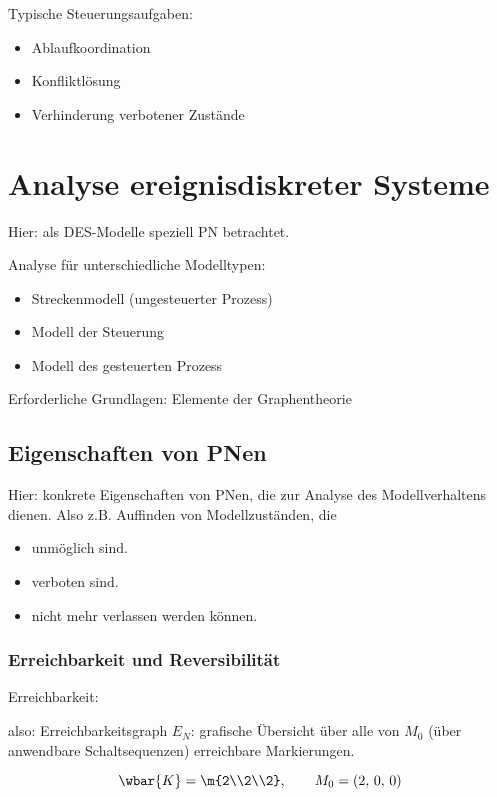 Typische Steuerungsaufgaben:
\begin{itemize}
	\item Ablaufkoordination
	\item Konfliktlösung
	\item Verhinderung verbotener Zustände
\end{itemize}

\section{Analyse ereignisdiskreter Systeme}
Hier: als DES-Modelle speziell PN betrachtet.

Analyse für unterschiedliche Modelltypen:
\begin{itemize}
	\item Streckenmodell (ungesteuerter Prozess)
	\item Modell der Steuerung
	\item Modell des gesteuerten Prozess
\end{itemize}

Erforderliche Grundlagen: Elemente der Graphentheorie 

\subsection{Eigenschaften von PNen}
Hier: konkrete Eigenschaften von PNen, die zur Analyse des Modellverhaltens dienen. Also z.B. Auffinden von Modellzuständen, die

\begin{itemize}
	\item unmöglich sind.
	\item verboten sind.
	\item nicht mehr verlassen werden können.
\end{itemize}

\subsubsection{Erreichbarkeit und Reversibilität}
Erreichbarkeit: 

also: Erreichbarkeitsgraph $E_N$: grafische Übersicht über alle von $M_0$ (über anwendbare Schaltsequenzen) erreichbare Markierungen.


\begin{equation}
	\wbar{K} = \m{2\\2\\2}, \qquad M_0 = (2,\,0,\,0)
\end{equation}

